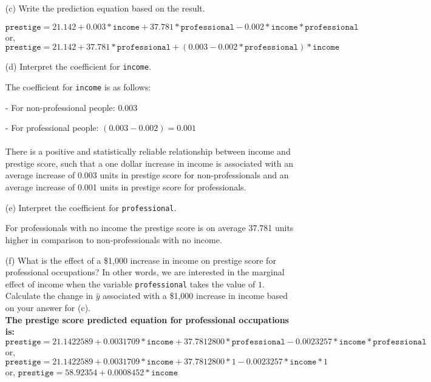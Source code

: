 \documentclass[12pt,letterpaper]{article}
\begin{document}
\begin{enumerate}
\newpage

	\item [(c)]
	Write the prediction equation based on the result.
	
	\textit{$\texttt{prestige} = 21.142 + 0.003*\texttt{income} + 37.781*\texttt{professional} - 0.002*\texttt{income}*\texttt{professional}$}\\
	or, \textit{$\texttt{prestige} = 21.142 + 37.781*\texttt{professional} + (0.003 - 0.002*\texttt{professional})*\texttt{income}$}
	
	\vspace*{0.5cm}

	\item [(d)]
	Interpret the coefficient for \texttt{income}.
	
	The coefficient for \texttt{income} is as follows:
	\item[-]
	For non-professional people: $0.003$
	\item[-]
	For professional people: $(0.003 - 0.002) = 0.001$
	\\\\
	There is a positive and statistically reliable relationship between income and prestige score, such that a one dollar increase in income is associated with an average increase of 0.003 units in prestige score for non-professionals and an average increase of 0.001 units in prestige score for professionals. 
	
	\vspace*{0.5cm}
	
	\item [(e)]
	Interpret the coefficient for \texttt{professional}.
	
	For professionals with no income the prestige score is on average 37.781 units higher in comparison to non-professionals with no income.
	
	\vspace*{0.5cm}
	
	\item [(f)]
	What is the effect of a \$1,000 increase in income on prestige score for professional occupations? In other words, we are interested in the marginal effect of income when the variable \texttt{professional} takes the value of $1$. Calculate the change in $\hat{y}$ associated with a \$1,000 increase in income based on your answer for (c).
	\\
	
	\textbf{The prestige score predicted equation for professional occupations is:}\\
	\textit{$\texttt{prestige} = 21.1422589 + 0.0031709*\texttt{income} + 37.7812800*\texttt{professional} - 0.0023257*\texttt{income}*\texttt{professional}$}\\
	or, \textit{$\texttt{prestige} = 21.1422589 + 0.0031709*\texttt{income} + 37.7812800 * 1 - 0.0023257*\texttt{income} * 1$}\\
	or, \textit{$\texttt{prestige} = 58.92354 + 0.0008452*\texttt{income}$}\\
	

\end{enumerate}
\end{document}
